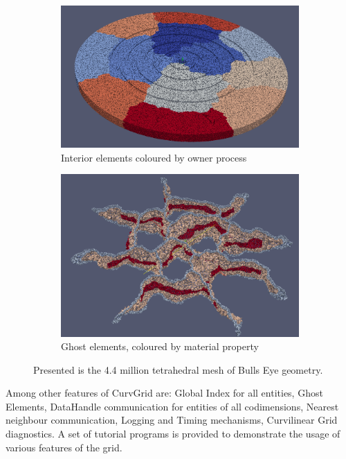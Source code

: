 \begin{figure}
    \centering
	\begin{subfigure}[b]{0.48\textwidth} \includegraphics[scale=0.20]{images/bullseye-core-angle}          \captionsetup{width=0.8\textwidth} \caption{Interior elements coloured by owner process}   \end{subfigure}
	\begin{subfigure}[b]{0.48\textwidth} \includegraphics[scale=0.17]{images/bullseye-ghostelements-angle}  \captionsetup{width=0.8\textwidth} \caption{Ghost elements, coloured by material property} \end{subfigure}
	\caption{Presented is the 4.4 million tetrahedral mesh of Bulls Eye geometry.}
	\label{fig:result:bullseye}
\end{figure}

\noindent
Among other features of CurvGrid are: Global Index for all entities, Ghost Elements, DataHandle communication for entities of all codimensions, Nearest neighbour communication, Logging and Timing mechanisms, Curvilinear Grid diagnostics. A set of tutorial programs is provided to demonstrate the usage of various features of the grid. \\

